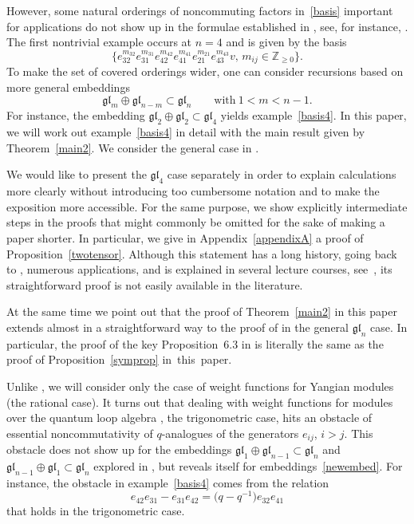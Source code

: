 \documentclass[10pt,a4paper]{amsart}
\numberwithin{equation}{section}
\begin{document}
However, some natural orderings of noncommuting factors in~\eqref{basis} important
for applications do not show up in the formulae established in \cite{TVC},
see, for instance, \cite{MV}.
The first nontrivial example occurs at $n=4$ and is given by the basis
\begin{equation}\label{basis4}
\bigl\{e_{32}^{m_{32}}e_{31}^{m_{31}}e_{42}^{m_{42}}e_{41}^{m_{41}}e_{21}^{m_{21}}e_{43}^{m_{43}}v,\,
 m_{ij}\in\mathbb{Z}_{\geq0}\bigr\}.
\end{equation}
To make the set of covered orderings wider, one can consider recursions based on more general
embeddings
\begin{equation}\label{newembed}
\mathfrak{gl}_m\oplus\mathfrak{gl}_{n-m}\subset \mathfrak{gl}_n \qquad \text{with}\ 1<m<n-1.
\end{equation}
For instance, the embedding
$\mathfrak{gl}_2\oplus \mathfrak{gl}_2\subset \mathfrak{gl}_4$ yields example~\eqref{basis4}.
In this paper, we will work out example~\eqref{basis4} in detail with the main result
given by Theorem~\ref{main2}. We consider the general case in \cite{KT}.

We would like to present the $\mathfrak{gl}_4$ case separately in order to explain calculations
more clearly without introducing too cumbersome notation and to make the exposition more
accessible. For the same purpose, we show explicitly intermediate steps in the proofs that
might commonly be omitted for the sake of making a paper shorter. In particular, we give in
Appendix~\ref{appendixA} a proof of Proposition~\ref{twotensor}. Although this statement has a long history,
going back to \cite{Kor}, numerous applications, and is explained in several lecture courses,
see~\cite{S2}, its straightforward proof is not easily available in the literature.

At the same time we point out that the proof of Theorem~\ref{main2} in this paper extends
almost in a straightforward way to the proof of \cite[Theorem~5.5]{KT} in the general
$\mathfrak{gl}_n$ case. In particular, the proof of the key Proposition~6.3 in \cite{KT}
is literally the same as the proof of Proposition~\ref{symprop} in~this~paper.

Unlike \cite{TVC}, we will consider only the case of weight functions for Yangian modules
(the rational case). It turns out that dealing with weight functions for modules over
the quantum loop algebra , the trigonometric case,
hits an obstacle of essential noncommutativity of $q$-analogues of the generators
$e_{ij}$, $i>j$. This obstacle does not show up for the embeddings
$\mathfrak{gl}_1\oplus \mathfrak{gl}_{n-1}\subset \mathfrak{gl}_n$ and
$\mathfrak{gl}_{n-1}\oplus \mathfrak{gl}_1 \subset \mathfrak{gl}_n$ explored in \cite{TVC},
but reveals itself for embeddings~\eqref{newembed}. For instance, the obstacle
in example~\eqref{basis4} comes from the relation
\begin{equation*}
e_{42}e_{31}-e_{31}e_{42}=\bigl(q-q^{-1}\bigr)e_{32}e_{41}
\end{equation*}
that holds in the trigonometric case.
\end{document}
